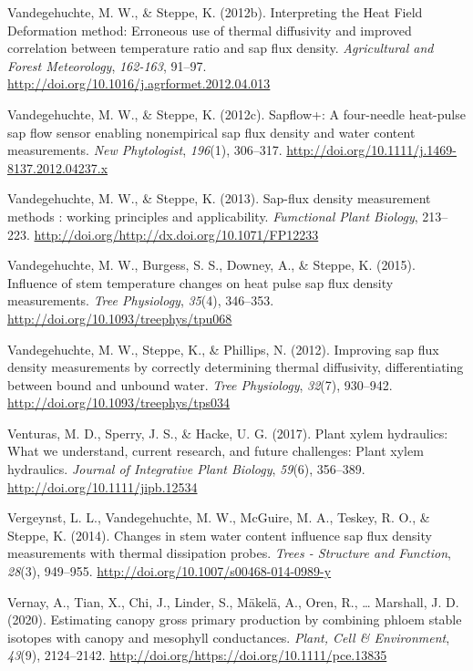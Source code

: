 \documentclass[11pt,twoside]{reedthesis}
\begin{document}
\hypertarget{ref-Vandegehuchte2012a}{}
Vandegehuchte, M. W., \& Steppe, K. (2012b). Interpreting the Heat Field
Deformation method: Erroneous use of thermal diffusivity and improved
correlation between temperature ratio and sap flux density.
\emph{Agricultural and Forest Meteorology}, \emph{162-163}, 91--97.
\url{http://doi.org/10.1016/j.agrformet.2012.04.013}

\hypertarget{ref-Vandegehuchte2012c}{}
Vandegehuchte, M. W., \& Steppe, K. (2012c). Sapflow+: A four-needle
heat-pulse sap flow sensor enabling nonempirical sap flux density and
water content measurements. \emph{New Phytologist}, \emph{196}(1),
306--317. \url{http://doi.org/10.1111/j.1469-8137.2012.04237.x}

\hypertarget{ref-Vandegehuchte2013}{}
Vandegehuchte, M. W., \& Steppe, K. (2013). Sap-flux density measurement
methods : working principles and applicability. \emph{Fumctional Plant
Biology}, 213--223.
\url{http://doi.org/http://dx.doi.org/10.1071/FP12233}

\hypertarget{ref-Vandegehuchte2015}{}
Vandegehuchte, M. W., Burgess, S. S., Downey, A., \& Steppe, K. (2015).
Influence of stem temperature changes on heat pulse sap flux density
measurements. \emph{Tree Physiology}, \emph{35}(4), 346--353.
\url{http://doi.org/10.1093/treephys/tpu068}

\hypertarget{ref-Vandegehuchte2012b}{}
Vandegehuchte, M. W., Steppe, K., \& Phillips, N. (2012). Improving sap
flux density measurements by correctly determining thermal diffusivity,
differentiating between bound and unbound water. \emph{Tree Physiology},
\emph{32}(7), 930--942. \url{http://doi.org/10.1093/treephys/tps034}

\hypertarget{ref-venturas_plant_2017}{}
Venturas, M. D., Sperry, J. S., \& Hacke, U. G. (2017). Plant xylem
hydraulics: What we understand, current research, and future challenges:
Plant xylem hydraulics. \emph{Journal of Integrative Plant Biology},
\emph{59}(6), 356--389. \url{http://doi.org/10.1111/jipb.12534}

\hypertarget{ref-Vergeynst2014}{}
Vergeynst, L. L., Vandegehuchte, M. W., McGuire, M. A., Teskey, R. O.,
\& Steppe, K. (2014). Changes in stem water content influence sap flux
density measurements with thermal dissipation probes. \emph{Trees -
Structure and Function}, \emph{28}(3), 949--955.
\url{http://doi.org/10.1007/s00468-014-0989-y}

\hypertarget{ref-Vernay2020}{}
Vernay, A., Tian, X., Chi, J., Linder, S., Mäkelä, A., Oren, R.,
\ldots{} Marshall, J. D. (2020). Estimating canopy gross primary
production by combining phloem stable isotopes with canopy and mesophyll
conductances. \emph{Plant, Cell \& Environment}, \emph{43}(9),
2124--2142. \url{http://doi.org/https://doi.org/10.1111/pce.13835}
\end{document}
